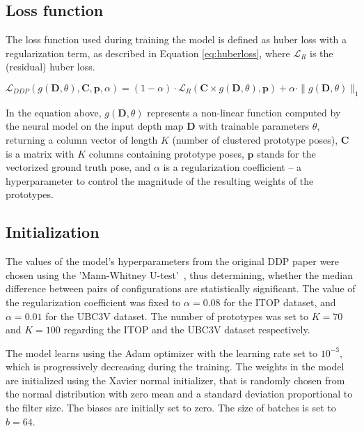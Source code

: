 \subsection{Loss function}

The loss function used during training the model is defined as huber loss with a regularization term, as described in Equation \ref{eq:huberloss}, where $\mathcal{L}_R$ is the (residual) huber loss.\par

\begin{equation}
\mathcal{L}_{DDP}(g(\mathbf{D}, \theta), \mathbf{C}, \mathbf{p}, \alpha) = (1 - \alpha) \cdot \mathcal{L}_R(\mathbf{C} \times g(\mathbf{D}, \theta), \mathbf{p}) + \alpha \cdot \|g(\mathbf{D}, \theta)\|_1 \label{eq:huberloss}
\end{equation} 

\noindent In the equation above, $g(\mathbf{D}, \theta)$ represents a non-linear function computed by the neural model on the input depth map $\mathbf{D}$ with trainable parameters $\theta$, returning a column vector of length $K$ (number of clustered prototype poses), $\mathbf{C}$ is a matrix with $K$ columns containing prototype poses, $\mathbf{p}$ stands for the vectorized ground truth pose,  and $\alpha$ is a regularization coefficient  – a hyperparameter to control the magnitude of the resulting weights of the prototypes.

\subsection{Initialization}

The values of the model's hyperparameters from the original DDP paper were chosen using the 'Mann-Whitney U-test'~\cite{mann1947}, thus determining, whether the median difference between pairs of configurations are statistically significant. The value of the regularization coefficient was fixed to $\alpha = 0.08$ for the ITOP dataset, and $\alpha = 0.01$ for the UBC3V dataset. The number of prototypes was set to $K=70$ and $K=100$ regarding the ITOP and the UBC3V dataset respectively.\par
\vspace{5mm}
\noindent
The model learns using the Adam optimizer with the learning rate set to $10^{-3}$, which is progressively decreasing during the training.  The weights in the model are initialized using the Xavier normal initializer, that is randomly chosen from the normal distribution with zero mean and a standard deviation proportional to the filter size. The biases are initially set to zero. The size of batches is set to $b=64$.

